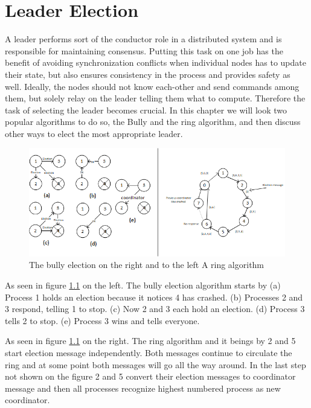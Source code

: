 \chapter{Leader Election} \label{ch:leaderElection}

A leader performs sort of the conductor role in a distributed system and is responsible for maintaining consensus. Putting this task on one job has the benefit of avoiding synchronization conflicts when individual nodes has to update their state, but also ensures consistency in the process and provides safety as well. Ideally, the nodes should not know each-other and send commands among them, but solely relay on the leader telling them what to compute. Therefore the task of selecting the leader becomes crucial. In this chapter we will look two popular algorithms to do so, the Bully and the ring algorithm, and then discuss other ways to elect the most appropriate leader.





\begin{figure}[H]
	\centering
	\includegraphics[width=1\linewidth]{leaderElection/data}
	\caption{The bully election on the right and to the left A ring algorithm}
	\label{fig:data}
\end{figure}
As seen in figure \ref{fig:data} on the left. The bully election algorithm starts by (a) Process 1 holds an election because it notices 4 has crashed. (b)
Processes 2 and 3 respond, telling 1 to stop. (c) Now 2 and 3 each hold an
election. (d) Process 3 tells 2 to stop. (e) Process 3 wins and tells everyone.

As seen in figure \ref{fig:data} on the right. The ring algorithm and it beings by 2 and 5 start election message independently. Both messages continue to circulate the ring and at some point both messages will go all the way around. In the last step not shown on the figure 2 and 5 convert their election messages to coordinator message and then all processes recognize highest numbered process as new coordinator.